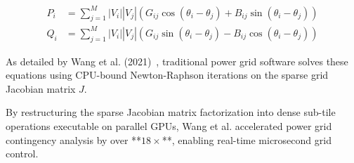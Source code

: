 \begin{align}
P_i &= \sum_{j=1}^M |V_i| |V_j| \left( G_{ij} \cos(\theta_i - \theta_j) + B_{ij} \sin(\theta_i - \theta_j) \right) \\
Q_i &= \sum_{j=1}^M |V_i| |V_j| \left( G_{ij} \sin(\theta_i - \theta_j) - B_{ij} \cos(\theta_i - \theta_j) \right)
\end{align}

As detailed by Wang et al. (2021)~\cite{wang2021fast}, traditional power grid software solves these equations using CPU-bound Newton-Raphson iterations on the sparse grid Jacobian matrix $J$. 

By restructuring the sparse Jacobian matrix factorization into dense sub-tile operations executable on parallel GPUs, Wang et al. accelerated power grid contingency analysis by over **$18\times$**, enabling real-time microsecond grid control.
